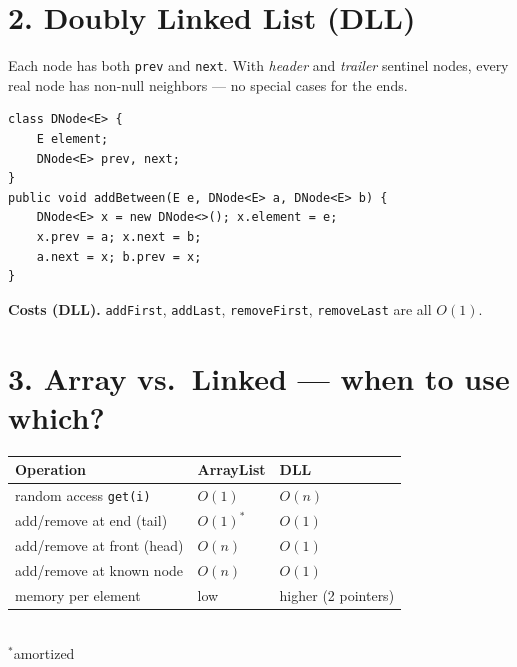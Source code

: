 \documentclass[11pt]{article}
\begin{document}
\section*{2. Doubly Linked List (DLL)}

Each node has both \texttt{prev} and \texttt{next}. With \emph{header} and \emph{trailer} sentinel nodes, every real node has non-null neighbors --- no special cases for the ends.

\begin{lstlisting}
class DNode<E> {
    E element;
    DNode<E> prev, next;
}
public void addBetween(E e, DNode<E> a, DNode<E> b) {
    DNode<E> x = new DNode<>(); x.element = e;
    x.prev = a; x.next = b;
    a.next = x; b.prev = x;
}
\end{lstlisting}

\textbf{Costs (DLL).} \texttt{addFirst}, \texttt{addLast}, \texttt{removeFirst}, \texttt{removeLast} are all $O(1)$.

\section*{3. Array vs.\ Linked --- when to use which?}

\begin{center}
\begin{tabular}{lll}
\textbf{Operation} & \textbf{ArrayList} & \textbf{DLL} \\
\hline
random access \texttt{get(i)}    & $O(1)$ & $O(n)$ \\
add/remove at end (tail)         & $O(1)^*$ & $O(1)$ \\
add/remove at front (head)       & $O(n)$ & $O(1)$ \\
add/remove at known node         & $O(n)$ & $O(1)$ \\
memory per element               & low & higher (2 pointers) \\
\end{tabular}\\[2pt]
\small $^*$amortized
\end{center}
\end{document}
